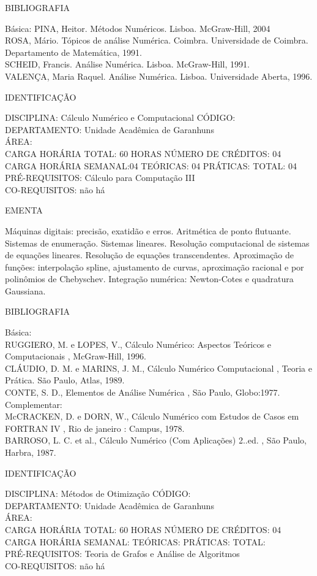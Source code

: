 \documentclass[
	12pt,				%
	openright,			%
  oneside,     %
	a4paper,			%
	english,			%
	french,				%
	spanish,			%
	brazil				%
	]{abntex2}
\begin{document}
\begin{apendicesenv}
BIBLIOGRAFIA 

Básica:
PINA, Heitor. Métodos Numéricos. Lisboa. McGraw-Hill, 2004\\
ROSA, Mário. Tópicos de análise Numérica. Coimbra. Universidade de Coimbra.
Departamento de Matemática, 1991.\\
SCHEID, Francis. Análise Numérica. Lisboa. McGraw-Hill, 1991.\\
VALENÇA, Maria Raquel. Análise Numérica. Lisboa. Universidade Aberta, 1996.

\newpage IDENTIFICAÇÃO

DISCIPLINA: Cálculo Numérico e Computacional CÓDIGO:\\
DEPARTAMENTO: Unidade Acadêmica de Garanhuns\\ 
ÁREA:\\
CARGA HORÁRIA TOTAL: 60 HORAS NÚMERO DE CRÉDITOS: 04\\
CARGA HORÁRIA SEMANAL:04 TEÓRICAS: 04 PRÁTICAS: TOTAL: 04\\
PRÉ-REQUISITOS: Cálculo para Computação III\\
CO-REQUISITOS: não há

EMENTA 

Máquinas digitais: precisão, exatidão e erros. Aritmética de ponto
flutuante. Sistemas de enumeração. Sistemas lineares. Resolução
computacional de sistemas de equações lineares. Resolução de equações
transcendentes. Aproximação de funções: interpolação spline,
ajustamento de curvas, aproximação racional e por polinômios de
Chebyschev. Integração numérica: Newton-Cotes e quadratura Gaussiana.

BIBLIOGRAFIA 

Básica:\\
RUGGIERO, M. e LOPES, V.,  Cálculo Numérico: Aspectos
Teóricos e Computacionais , McGraw-Hill, 1996.\\
CLÁUDIO, D. M. e MARINS, J. M.,  Cálculo Numérico
Computacional , Teoria e Prática. São Paulo, Atlas,
1989.\\
CONTE, S. D.,  Elementos de Análise
Numérica , São Paulo, Globo:1977.\\
Complementar:\\
McCRACKEN, D. e DORN, W.,  Cálculo Numérico com
Estudos de Casos em FORTRAN IV , Rio de janeiro :
Campus, 1978.\\
BARROSO, L. C. et al.,  Cálculo Numérico (Com
Aplicações) 2..ed. , São Paulo, Harbra, 1987.

\newpage IDENTIFICAÇÃO

DISCIPLINA: Métodos de Otimização CÓDIGO:\\
DEPARTAMENTO: Unidade Acadêmica de Garanhuns\\
ÁREA: \\
CARGA HORÁRIA TOTAL: 60 HORAS NÚMERO DE CRÉDITOS: 04\\
CARGA HORÁRIA SEMANAL: TEÓRICAS: PRÁTICAS: TOTAL: \\
PRÉ-REQUISITOS: Teoria de Grafos e Análise de Algoritmos\\
CO-REQUISITOS: não há


\end{apendicesenv}
\end{document}
